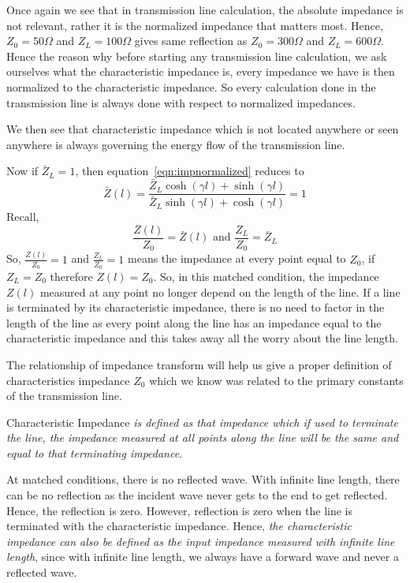 Once again we see that in transmission line calculation, the absolute impedance is not relevant, rather it is the normalized impedance that matters most. Hence, $Z_0 = 50\Omega$ and $Z_L = 100\Omega$ gives same reflection as $Z_0 = 300\Omega$ and $Z_L =600\Omega$. Hence the reason why before starting any transmission line calculation, we ask ourselves what the characteristic impedance is, every impedance we have is then normalized to the characteristic impedance. So every calculation done in the transmission line is always done with respect to normalized impedances.

We then see that characteristic impedance which is not located anywhere or seen anywhere is always governing the energy flow of the transmission line.

Now if $\bar{Z}_L = 1$, then equation~\eqref{eqn:impnormalized} reduces to
\begin{dmath*}
\bar{Z}(l) = {\frac{\bar{Z}_L\cosh(\gamma l) + \sinh(\gamma l)}{\bar{Z}_L\sinh(\gamma l) + \cosh(\gamma l)}} = 1
\end{dmath*}
Recall,
\[\frac{Z(l)}{Z_0} = \bar{Z}(l)\text{ and }\frac{Z_L}{Z_0} = \bar{Z}_L\]
So, $\frac{Z(l)}{Z_0} = 1$ and $\frac{Z_L}{Z_0} = 1$ means the impedance at every point equal to $Z_0$, if $Z_L = Z_0$ therefore $Z(l) = Z_0$. So, in this matched condition, the impedance $Z(l)$ measured at any point no longer depend on the length of the line. If a line is terminated by its characteristic impedance, there is no need to factor in the length of the line as every point along the line has an impedance equal to the characteristic impedance and this takes away all the worry about the line length.

The relationship of impedance transform will help us give a proper definition of characteristics impedance $Z_0$ which we know was related to the primary constants of the transmission line.

Characteristic Impedance \emph{is defined as that impedance which if used to terminate the line, the impedance measured at all points along the line will be the same and equal to that terminating impedance}.

At matched conditions, there is no reflected wave. With infinite line length, there can be no reflection as the incident wave never gets to the end to get reflected. Hence, the reflection is zero. However, reflection is zero when the line is terminated with the characteristic impedance. Hence, \emph{the characteristic impedance can also be defined as the input impedance measured with infinite line length}, since with infinite line length, we always have a forward wave and never a reflected wave.

